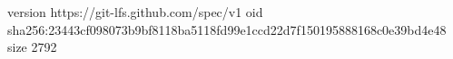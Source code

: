 version https://git-lfs.github.com/spec/v1
oid sha256:23443cf098073b9bf8118ba5118fd99e1ccd22d7f150195888168c0e39bd4e48
size 2792
